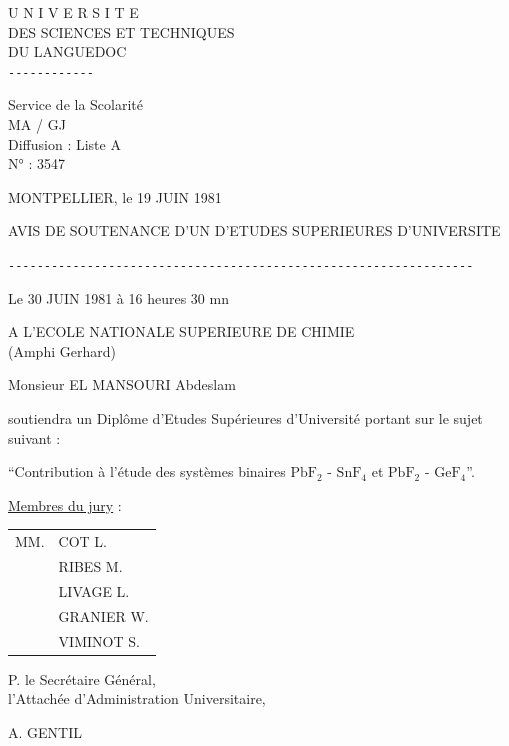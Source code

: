 \begin{center}
U N I V E R S I T E\\
DES SCIENCES ET TECHNIQUES\\
DU LANGUEDOC\\
\texttt{-{}-{}-{}-{}-{}-{}-{}-{}-{}-{}-{}-{}}

Service de la Scolarité\\
MA / GJ\\
Diffusion : Liste A\\
N° : 3547
\end{center}

MONTPELLIER, le 19 JUIN 1981

AVIS DE SOUTENANCE D'UN  D'ETUDES SUPERIEURES D'UNIVERSITE

\texttt{-{}-{}-{}-{}-{}-{}-{}-{}-{}-{}-{}-{}-{}-{}-{}-{}-{}-{}-{}-{}-{}-{}-{}-{}-{}-{}-{}-{}-{}-{}-{}-{}-{}-{}-{}-{}-{}-{}-{}-{}-{}-{}-{}-{}-{}-{}-{}-{}-{}-{}-{}-{}-{}-{}-{}-{}-{}-{}-{}-{}-{}-{}-{}-{}-{}}

Le 30 JUIN 1981 à 16 heures 30 mn

A L'ECOLE NATIONALE SUPERIEURE DE CHIMIE\\
(Amphi Gerhard)

Monsieur EL MANSOURI Abdeslam

soutiendra un Diplôme d'Etudes Supérieures d'Université portant sur le sujet suivant :

``Contribution à l'étude des systèmes binaires $\mathrm{PbF}_2$ - $\mathrm{SnF}_4$ et $\mathrm{PbF}_2$ - $\mathrm{GeF}_4$''.

\uline{Membres du jury} :
\begin{tabular}{ll}
MM.&COT L.\\
&RIBES M.\\
&LIVAGE L.\\
&GRANIER W.\\
&VIMINOT S.
\end{tabular}

P. le Secrétaire Général,\\
l'Attachée d'Administration Universitaire,

A. GENTIL
